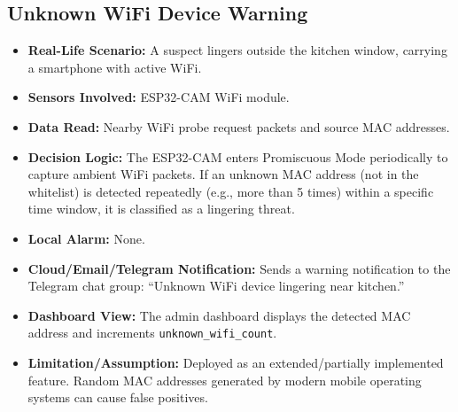 \documentclass[11pt,a4paper]{report}
\begin{document}
\subsection{Unknown WiFi Device Warning}
\begin{itemize}
    \item \textbf{Real-Life Scenario:} A suspect lingers outside the kitchen window, carrying a smartphone with active WiFi.
    \item \textbf{Sensors Involved:} ESP32-CAM WiFi module.
    \item \textbf{Data Read:} Nearby WiFi probe request packets and source MAC addresses.
    \item \textbf{Decision Logic:} The ESP32-CAM enters Promiscuous Mode periodically to capture ambient WiFi packets. If an unknown MAC address (not in the whitelist) is detected repeatedly (e.g., more than 5 times) within a specific time window, it is classified as a lingering threat.
    \item \textbf{Local Alarm:} None.
    \item \textbf{Cloud/Email/Telegram Notification:} Sends a warning notification to the Telegram chat group: ``Unknown WiFi device lingering near kitchen.''
    \item \textbf{Dashboard View:} The admin dashboard displays the detected MAC address and increments \texttt{unknown\_wifi\_count}.
    \item \textbf{Limitation/Assumption:} Deployed as an extended/partially implemented feature. Random MAC addresses generated by modern mobile operating systems can cause false positives.
\end{itemize}
\end{document}

